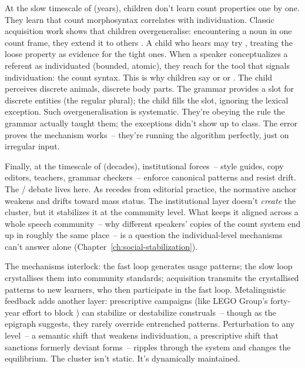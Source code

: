 At the slow timescale of  (years), children don't learn count properties one by one. They learn that count morphosyntax correlates with individuation. Classic acquisition work shows that children overgeneralise: encountering a noun in one count frame, they extend it to others \citep{bloom1994a,gordon1985}. A child who hears  may try \ungram{}, treating the loose property as evidence for the tight ones. When a speaker conceptualizes a referent as individuated (bounded, atomic), they reach for the tool that signals individuation: the count syntax. This is why children say  or  or . The child perceives discrete animals, discrete body parts. The grammar provides a slot for discrete entities (the regular plural); the child fills the slot, ignoring the lexical exception. Such overgeneralisation is systematic. They're obeying the rule the grammar actually taught them; the exceptions didn't show up to class. The error proves the mechanism works~-- they're running the algorithm perfectly, just on irregular input.

Finally, at the timescale of  (decades), institutional forces~-- style guides, copy editors, teachers, grammar checkers~-- enforce canonical patterns and resist drift. The / debate lives here. As  recedes from editorial practice, the normative anchor weakens and  drifts toward mass status. The institutional layer doesn't \emph{create} the cluster, but it stabilizes it at the community level. What keeps it aligned across a whole speech community~-- why different speakers' copies of the count system end up in roughly the same place~-- is a question the individual-level mechanisms can't answer alone (Chapter~\ref{ch:social-stabilization}).

The mechanisms interlock: the fast loop generates usage patterns; the slow loop crystallises them into community standards; acquisition transmits the crystallised patterns to new learners, who then participate in the fast loop. Metalinguistic feedback adds another layer: prescriptive campaigns (like LEGO Group's forty-year effort to block ) can stabilize or destabilize construals~-- though as the epigraph suggests, they rarely override entrenched patterns. Perturbation to any level~-- a semantic shift that weakens individuation, a prescriptive shift that sanctions formerly deviant forms~-- ripples through the system and changes the equilibrium. The cluster isn't static. It's dynamically maintained.

